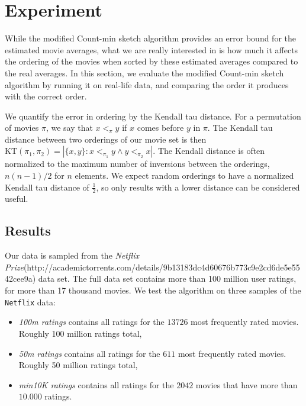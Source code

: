 \section{Experiment}
While the modified Count-min sketch algorithm provides an error bound for the
estimated movie averages, what we are really interested in is how much it
affects the ordering of the movies when sorted by these estimated averages
compared to the real averages. In this section, we evaluate the modified
Count-min sketch algorithm by running it on real-life data, and comparing the
order it produces with the correct order. 

We quantify the error in ordering by the Kendall tau distance. For a permutation
of movies $\pi$, we say that $x <_\pi y$ if $x$ comes before $y$ in $\pi$. The
Kendall tau distance between two orderings of our movie set is then $\mathrm{KT}
\left(\pi_1,\pi_2\right) = \left|\{x,y\}: x <_{\pi_1} y \wedge y <_{\pi_2}
x\right|$. The Kendall distance is often normalized to the maximum number of
inversions between the orderings, $n(n-1)/2$ for $n$ elements. We expect random
orderings to have a normalized Kendall tau distance of $\frac{1}{2}$, so
only results with a lower distance can be considered useful.

\subsection{Results}
Our data is sampled from the \textit{Netflix
Prize}(http://academictorrents.com/details/9b13183dc4d60676b773c9e2cd6de5e5542cee9a) data set.
The full data set contains more than 100 million user ratings, for more than 17
thousand movies.
We test the algorithm on three samples of the \texttt{Netflix} data:
\begin{itemize}
	\item \textit{100m ratings} contains all ratings for the $13726$ most
		frequently rated movies. Roughly 100 million ratings total,
	\item \textit{50m ratings} contains all ratings for the $611$ most
		frequently rated movies. Roughly 50 million ratings total,
	\item \textit{min10K ratings} contains all ratings for the $2042$ movies that have more
		than $10.000$ ratings.


\end{itemize}

\pgfplotsset{scaled x ticks=false}
\begin{center}
\end{center}

